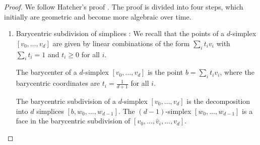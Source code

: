\begin{proof}
	We follow Hatcher's proof \cite[Proposition 2.21]{hatcher2005algebraic}. The proof is divided into four steps, which initially are geometric and become more algebraic over time.
	
	\begin{enumerate}
	\item Barycentric subdivision of simplices \cite[Proposition 2.21 (1)]{hatcher2005algebraic}: We recall that the points of a $d$-simplex $[v_0, \ldots, v_d]$ are given by linear combinations of the form $\sum_{i} t_i v_i$ with $\sum_i t_i = 1$ and $t_i \geq 0$ for all $i$.
			
	\begin{definition}[Barycenter]
		The barycenter of a $d$-simplex $[v_0, \ldots, v_d]$ is the point $b = \sum_i t_i v_i$, where the barycentric coordinates are $t_i = \frac{1}{d+1}$ for all $i$.
	\end{definition}
			
	\begin{definition}
		The barycentric subdivision of a $d$-simplex $[v_0, \ldots, v_d]$ is the decomposition into $d$ simplices $[b, w_0, \ldots, w_{d-1}]$. The $(d-1)$-simplex $[w_0, \ldots, w_{d-1}]$ is a face in the barycentric subdivision of $[v_0, \ldots, \hat{v}_i, \ldots, v_d]$.
	\end{definition}
			

\end{enumerate}
\end{proof}
